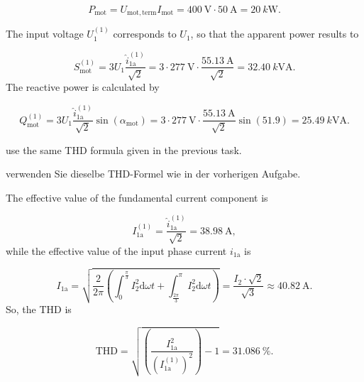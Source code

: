 \begin{solutionblock}
   
    $$ P_\mathrm{mot} = U_\mathrm{mot,term} I_\mathrm{mot}=\SI{400}{\volt} \cdot \SI{50}{\ampere} = \SI{20}{k\watt}.$$

    The input voltage $U_\mathrm{1}^\mathrm{(1)}$ corresponds to $U_\mathrm{1}$, so that the apparent power results to

        $$    S_\mathrm{mot}^\mathrm{(1)} = 3 U_\mathrm{1} \frac{\hat{i}_\mathrm{1a}^\mathrm{(1)}}{\sqrt{2}}= 3 \cdot \SI{277}{\volt} \cdot \frac{\SI{55.13}{\ampere}}{\sqrt{2}}= \SI{32.40}{k\volt\ampere}.$$
    The reactive power is calculated by

        $$    Q_\mathrm{mot}^\mathrm{(1)} = 3 U_\mathrm{1} \frac{\hat{i}_\mathrm{1a}^\mathrm{(1)}}{\sqrt{2}} \sin{(\alpha_\mathrm{mot})}
            = 3 \cdot \SI{277}{\volt} \cdot \frac{\SI{55.13}{\ampere}}{\sqrt{2}}\sin{(51.9)}= \SI{25.49}{k\volt\ampere}.$$

\end{solutionblock}
\begin{hintblock}
    use the same THD formula given in the previous task.
\end{hintblock}
\begin{germanhintblock}
    verwenden Sie dieselbe THD-Formel wie in der vorherigen Aufgabe.
\end{germanhintblock}
\begin{solutionblock}
    The effective value of the fundamental current component is
    
    $$    I^\mathrm{(1)}_\mathrm{1a} = \frac{\hat{i}^\mathrm{(1)}_\mathrm{1a}}{\sqrt{2}} = \SI{38.98}{\ampere},$$
    while the effective value of the input phase current $i_\mathrm{1a}$ is 

    $$    I_\mathrm{1a} = \sqrt{\frac{2}{2\pi}\left(\int_{0}^{\frac{\pi}{3}} I^2_\mathrm{2}\mathrm{d}\omega t + \int_{\frac{2\pi}{3}}^{\pi} I^2_\mathrm{2}\mathrm{d}\omega t\right)} =  \frac{I_\mathrm{2}\cdot \sqrt{2}}{\sqrt{3}} \approx \SI{40.82}{\ampere}.$$
    So, the THD is

    $$    \mathrm{THD} = \sqrt{\left(\frac{I^2_\mathrm{1a}}{(I^\mathrm{(1)}_\mathrm{1a})^2}\right)-1} = \SI{31.086}{\percent}.$$  
\end{solutionblock}
